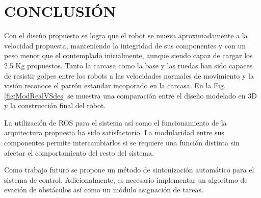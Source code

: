 \documentclass[twocolumn,10pt]{amrob}
\begin{document}


\section*{CONCLUSIÓN}
Con el diseño propuesto se logra que el robot se mueva aproximadamente a la velocidad propuesta, manteniendo la integridad de sus componentes y con un peso menor que el contemplado inicialmente, aunque siendo capaz de cargar los 2.5 Kg propuestos. Tanto la carcasa como la base y las ruedas han sido capaces de resistir golpes entre los robots a las velocidades normales de movimiento y la visión reconoce el patrón estandar incoporado en la carcasa. En la Fig. \ref{fig:ModRealVSdes} se muestra una comparación entre el diseño modelado en 3D y la construcción final del robot.\par 
La utilización de ROS para el sistema así como el funcionamiento de la arquitectura propuesta ha sido satisfactorio. La modularidad entre sus componentes permite intercambiarlos si se requiere una función distinta sin afectar el comportamiento del resto del sistema. \par
Como trabajo futuro se propone un método de sintonización automático para el sistema de control. Adicionalmente, es necesario implementar un algoritmo de evación de obstáculos así como un módulo asignación de tareas. \par
\end{document}
